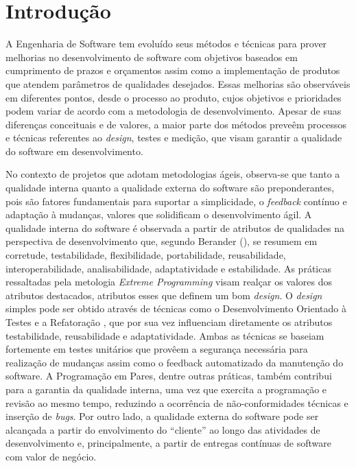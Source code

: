 \chapter{Introdução}
\label{cap-introducao}

A Engenharia de Software tem evoluído seus métodos e técnicas para prover melhorias no desenvolvimento de software com objetivos baseados em cumprimento de prazos e orçamentos assim como a implementação de produtos que atendem parâmetros de qualidades desejados. Essas melhorias são observáveis em diferentes pontos, desde o processo ao produto, cujos objetivos e prioridades podem variar de acordo com a metodologia de desenvolvimento.
%
Apesar de suas diferenças conceituais e de valores, a maior parte dos métodos preveêm processos e técnicas referentes ao \emph{design}, testes e medição, que visam garantir a qualidade do software em desenvolvimento.


No contexto de projetos que adotam metodologias ágeis, observa-se que tanto a qualidade interna quanto a qualidade externa do software são preponderantes, pois são fatores fundamentais para suportar a simplicidade, o \emph{feedback} contínuo e adaptação à mudanças, valores que solidificam o desenvolvimento ágil.
%
A qualidade interna do software é observada a partir de atributos de qualidades na perspectiva de desenvolvimento que, segundo Berander (\citeyear{berander2005}), se resumem em corretude, testabilidade, flexibilidade, portabilidade, reusabilidade, interoperabilidade, analisabilidade, adaptatividade e estabilidade. As práticas ressaltadas pela metologia \emph{Extreme Programming} \cite{beck2000} visam realçar os valores dos atributos destacados, atributos esses que definem um bom \emph{design}.
%
O \emph{design} simples pode ser obtido através de técnicas como o Desenvolvimento Orientado à Testes \cite{beck2002} e a Refatoração \cite{fowler1999}, que por sua vez influenciam diretamente os atributos testabilidade, reusabilidade e adaptatividade. Ambas as técnicas se baseiam fortemente em testes unitários que provêem a segurança necessária para realização de mudanças assim como o feedback automatizado da manutenção do software.
%
A Programação em Pares, dentre outras práticas, também contribui para a garantia da qualidade interna, uma vez que exercita a programação e revisão ao mesmo tempo, reduzindo a ocorrência de não-conformidades técnicas e inserção de \emph{bugs}. Por outro lado, a qualidade externa do software pode ser alcançada a partir do envolvimento do ``cliente'' ao longo das atividades de desenvolvimento e, principalmente, a partir de entregas contínuas de software com valor de negócio.


